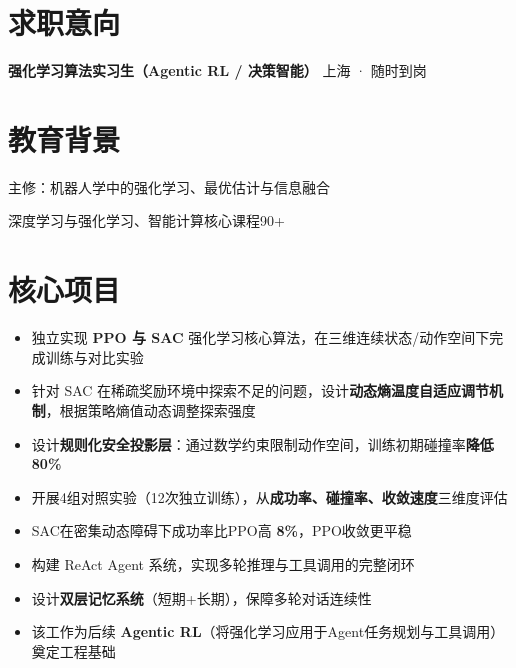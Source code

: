 \documentclass{resume}
\begin{document}

\section{求职意向}
\vspace{-4pt}
\textbf{强化学习算法实习生（Agentic RL / 决策智能）} \hfill 上海 · 随时到岗

\section{教育背景}
主修：机器人学中的强化学习、最优估计与信息融合

深度学习与强化学习、智能计算核心课程90+

\section{核心项目}
\begin{itemize}
  \item 独立实现 \textbf{PPO 与 SAC} 强化学习核心算法，在三维连续状态/动作空间下完成训练与对比实验
  \item 针对 SAC 在稀疏奖励环境中探索不足的问题，设计\textbf{动态熵温度自适应调节机制}，根据策略熵值动态调整探索强度
  \item 设计\textbf{规则化安全投影层}：通过数学约束限制动作空间，训练初期碰撞率\textbf{降低 80\%}
  \item 开展4组对照实验（12次独立训练），从\textbf{成功率、碰撞率、收敛速度}三维度评估
  \item SAC在密集动态障碍下成功率比PPO高 \textbf{8\%}，PPO收敛更平稳
\end{itemize}

\begin{itemize}
  \item 构建 ReAct Agent 系统，实现多轮推理与工具调用的完整闭环
  \item 设计\textbf{双层记忆系统}（短期+长期），保障多轮对话连续性
  \item 该工作为后续 \textbf{Agentic RL}（将强化学习应用于Agent任务规划与工具调用）奠定工程基础
\end{itemize}
\end{document}
